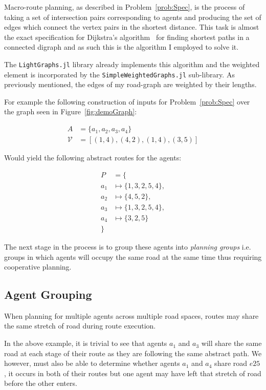 Macro-route planning, as described in Problem~\ref{prob:Spec}, is the process of taking a set of intersection pairs corresponding to agents and producing the set of edges which connect the vertex pairs in the shortest distance. This task is almost the exact specification for Dijkstra's algorithm~\cite{dijkstra1959note} for finding shortest paths in a connected digraph and as such this is the algorithm I employed to solve it.

The \texttt{LightGraphs.jl} library already implements this algorithm and the weighted element is incorporated by the \texttt{SimpleWeightedGraphs.jl} sub-library. As previously mentioned, the edges of my road-graph are weighted by their lengths.

For example the following construction of inputs for Problem~\ref{prob:Spec} over the graph seen in Figure~\ref{fig:demoGraph}:

\begin{align*}
  A &= \{ a_{1},a_{2},a_{3},a_{4} \} \\
  \mathcal{V} &= [ (1,4), (4,2), (1,4), (3,5) ]
\end{align*}

Would yield the following abstract routes for the agents:


\begin{align*}
  P &= \{ \\
  a_{1} &\mapsto \{ 1,3,2,5,4 \}, \\
  a_{2} &\mapsto \{ 4,5,2 \}, \\
  a_{3} &\mapsto \{ 1,3,2,5,4 \} ,\\
  a_{4} &\mapsto \{ 3,2,5 \} \\
          \}
\end{align*}

The next stage in the process is to group these agents into \textit{planning groups} i.e. groups in which agents will occupy the same road at the same time thus requiring cooperative planning.

\subsection{Agent Grouping}

When planning for multiple agents across multiple road spaces, routes may share the same stretch of road during route execution.

In the above example, it is trivial to see that agents $a_{1}$ and $a_{3}$ will share the same road at each stage of their route as they are following the same abstract path. We however, must also be able to determine whether agents $a_{1}$ and $a_{4}$ share road $e25$, it occurs in both of their routes but one agent may have left that stretch of road before the other enters.

